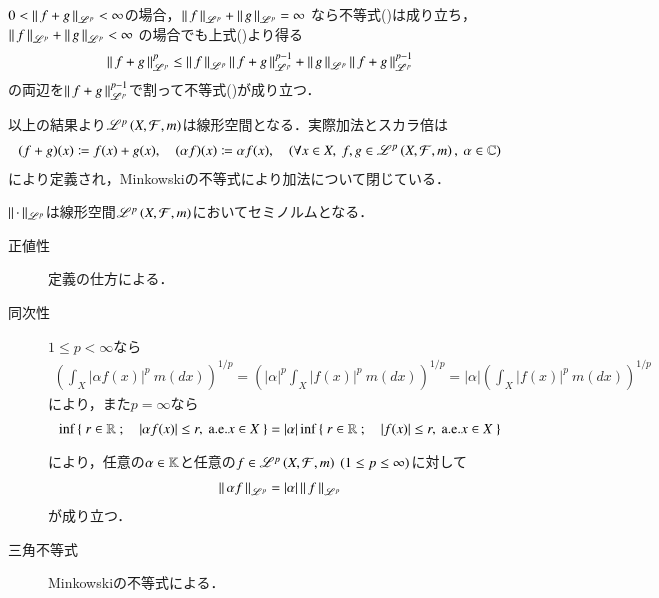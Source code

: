 \begin{prf}
\begin{description}
			$0 < \left\|\, f+g\, \right\|_{\mathscr{L}^p} < \infty$の場合，$\left\|\, f\, \right\|_{\mathscr{L}^p} + \left\|\, g\, \right\|_{\mathscr{L}^p} = \infty$
			なら不等式()は成り立ち，$\left\|\, f\, \right\|_{\mathscr{L}^p} + \left\|\, g\, \right\|_{\mathscr{L}^p} < \infty$
			の場合でも上式()より得る
			\begin{align}
				\left\|\, f+g\, \right\|_{\mathscr{L}^p}^p \leq \left\|\, f\, \right\|_{\mathscr{L}^p}\left\|\, f+g\, \right\|_{\mathscr{L}^p}^{p-1} + \left\|\, g\, \right\|_{\mathscr{L}^p}\left\|\, f+g\, \right\|_{\mathscr{L}^p}^{p-1}
			\end{align}
			の両辺を$\left\|\, f+g\, \right\|_{\mathscr{L}^p}^{p-1}$で割って不等式()が成り立つ．		
	\end{description}
	\QED
\end{prf}

以上の結果より$\mathscr{L}^{p} \left(X,\mathcal{F},m\right)$は線形空間となる．実際加法とスカラ倍は
\begin{align}
	(f+g)(x) \coloneqq f(x) + g(x), \quad (\alpha f)(x) \coloneqq \alpha f(x), \quad (\forall x \in X,\ f,g \in \semiLp{p}{X,\mathcal{F},m},\ \alpha \in \C)
\end{align}
により定義され，Minkowskiの不等式により加法について閉じている．

\begin{itembox}[l]{}
	\begin{lem}
		$\left\|\, \cdot\, \right\|_{\mathscr{L}^p}$は線形空間$\mathscr{L}^{p} \left(X,\mathcal{F},m\right)$においてセミノルムとなる．
	\end{lem}
\end{itembox}
\begin{prf}\mbox{}
	\begin{description}
	\item[正値性] 定義の仕方による．
	\item[同次性] 
		$1 \leq p < \infty$なら
		\begin{align}
			\left( \int_{X} |\alpha f(x)|^p\ m(dx) \right)^{1/p} = \left( |\alpha|^p \int_{X} |f(x)|^p\ m(dx) \right)^{1/p} 
			= |\alpha| \left( \int_{X} |f(x)|^p\ m(dx) \right)^{1/p}
		\end{align}
		により，また$p = \infty$なら
		\begin{align}
			\operatorname*{inf}_{} \left\{\ r \in \mathbb{R}\ ;\quad |\alpha f(x)| \leq r,\ \mathrm{a.e.}x \in X\ \right\} = |\alpha|\operatorname*{inf}_{} \left\{\ r \in \mathbb{R}\ ;\quad |f(x)| \leq r,\ \mathrm{a.e.}x \in X\ \right\}
		\end{align}
		により，任意の$\alpha \in \mathbb{K}$と任意の$f \in \mathscr{L}^{p} \left(X,\mathcal{F},m\right)\ (1 \leq p \leq \infty)$に対して
		\begin{align}
			\left\|\, \alpha f\, \right\|_{\mathscr{L}^p} = |\alpha|\left\|\, f\, \right\|_{\mathscr{L}^p}
		\end{align}
		が成り立つ．
	\item[三角不等式] Minkowskiの不等式による．
	\end{description}
	\QED
\end{prf}

